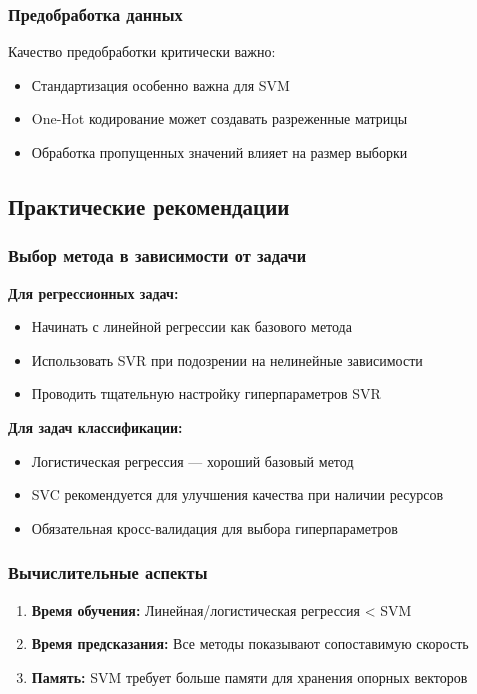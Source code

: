 \documentclass[a4paper]{article}
\begin{document}
\subsubsection{Предобработка данных}
Качество предобработки критически важно:
\begin{itemize}
    \item Стандартизация особенно важна для SVM
    \item One-Hot кодирование может создавать разреженные матрицы
    \item Обработка пропущенных значений влияет на размер выборки
\end{itemize}

\subsection{Практические рекомендации}

\subsubsection{Выбор метода в зависимости от задачи}

\textbf{Для регрессионных задач:}
\begin{itemize}
    \item Начинать с линейной регрессии как базового метода
    \item Использовать SVR при подозрении на нелинейные зависимости
    \item Проводить тщательную настройку гиперпараметров SVR
\end{itemize}

\textbf{Для задач классификации:}
\begin{itemize}
    \item Логистическая регрессия — хороший базовый метод
    \item SVC рекомендуется для улучшения качества при наличии ресурсов
    \item Обязательная кросс-валидация для выбора гиперпараметров
\end{itemize}

\subsubsection{Вычислительные аспекты}
\begin{enumerate}
    \item \textbf{Время обучения:} Линейная/логистическая регрессия < SVM
    \item \textbf{Время предсказания:} Все методы показывают сопоставимую скорость
    \item \textbf{Память:} SVM требует больше памяти для хранения опорных векторов
\end{enumerate}
\end{document}
